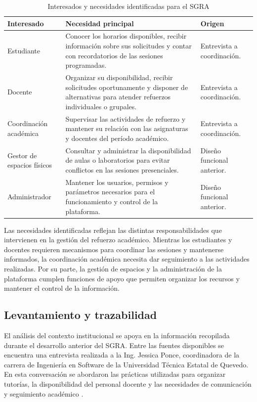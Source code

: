 \begin{table}[htbp]
\centering
\caption{Interesados y necesidades identificadas para el SGRA}
\label{tab:interesados-sgra}
\small
\begin{tabularx}{\textwidth}{@{}p{}X p{}@{}}
\toprule
\textbf{Interesado} & \textbf{Necesidad principal} & \textbf{Origen} \\
\midrule
Estudiante &
Conocer los horarios disponibles, recibir información sobre sus solicitudes y contar con recordatorios de las sesiones programadas. &
Entrevista a coordinación. \\

Docente &
Organizar su disponibilidad, recibir solicitudes oportunamente y disponer de alternativas para atender refuerzos individuales o grupales. &
Entrevista a coordinación. \\

Coordinación académica &
Supervisar las actividades de refuerzo y mantener su relación con las asignaturas y docentes del período académico. &
Entrevista a coordinación. \\

Gestor de espacios físicos &
Consultar y administrar la disponibilidad de aulas o laboratorios para evitar conflictos en las sesiones presenciales. &
Diseño funcional anterior. \\

Administrador &
Mantener los usuarios, permisos y parámetros necesarios para el funcionamiento y control de la plataforma. &
Diseño funcional anterior. \\
\bottomrule
\end{tabularx}
\end{table}

Las necesidades identificadas reflejan las distintas responsabilidades que intervienen en la gestión del refuerzo académico. Mientras los estudiantes y docentes requieren mecanismos para coordinar las sesiones y mantenerse informados, la coordinación académica necesita dar seguimiento a las actividades realizadas. Por su parte, la gestión de espacios y la administración de la plataforma cumplen funciones de apoyo que permiten organizar los recursos y mantener el control de la información.

\subsection{Levantamiento y trazabilidad}

El análisis del contexto institucional se apoya en la información recopilada durante el desarrollo anterior del SGRA. Entre las fuentes disponibles se encuentra una entrevista realizada a la Ing. Jessica Ponce, coordinadora de la carrera de Ingeniería en Software de la Universidad Técnica Estatal de Quevedo. En esta conversación se abordaron las prácticas utilizadas para organizar tutorías, la disponibilidad del personal docente y las necesidades de comunicación y seguimiento académico \cite{Ponce2025-Entrevista}.

